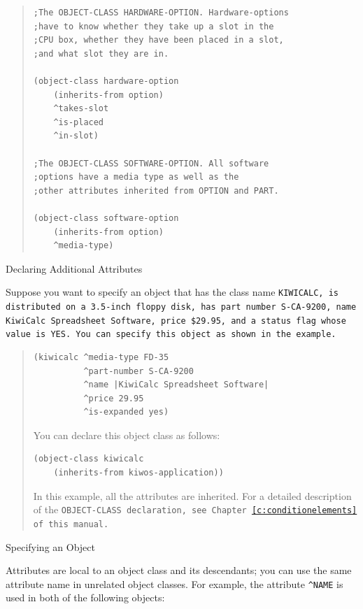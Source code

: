 \begin{example}[h]
\begin{quote}
\begin{verbatim}
;The OBJECT-CLASS HARDWARE-OPTION. Hardware-options
;have to know whether they take up a slot in the
;CPU box, whether they have been placed in a slot,
;and what slot they are in.

(object-class hardware-option
    (inherits-from option)
    ^takes-slot
    ^is-placed
    ^in-slot)

;The OBJECT-CLASS SOFTWARE-OPTION. All software
;options have a media type as well as the
;other attributes inherited from OPTION and PART.

(object-class software-option
    (inherits-from option)
    ^media-type)
\end{verbatim}
\end{quote}
\caption{Declaring Additional Attributes}
\label{e:declattr}
\end{example}

Suppose you want to specify an object that has the class name
\tt{KIWICALC}, is distributed on a 3.5-inch floppy disk, has part
number S-CA-9200, name KiwiCalc Spreadsheet Software, price {\$}29.95,
and a status flag whose value is \tt{YES}. You can specify this object
as shown in the example.

\begin{example}[h]
\begin{quote}
\begin{verbatim}
(kiwicalc ^media-type FD-35
          ^part-number S-CA-9200
          ^name |KiwiCalc Spreadsheet Software|
          ^price 29.95
          ^is-expanded yes)
\end{verbatim}
You can declare this object class as follows:
\begin{verbatim}
(object-class kiwicalc
    (inherits-from kiwos-application))
\end{verbatim}           
In this example, all the attributes are inherited. For a detailed
description of the \tt{OBJECT-CLASS} declaration, see
Chapter~\ref{c:conditionelements} of this manual.
\end{quote}
\caption{Specifying an Object}
\label{e:specobj}
\end{example}

Attributes are local to an object class and its descendants;
you can use the same attribute name in unrelated object
classes. For example, the attribute \verb|^NAME| is used in both of
the following objects:

